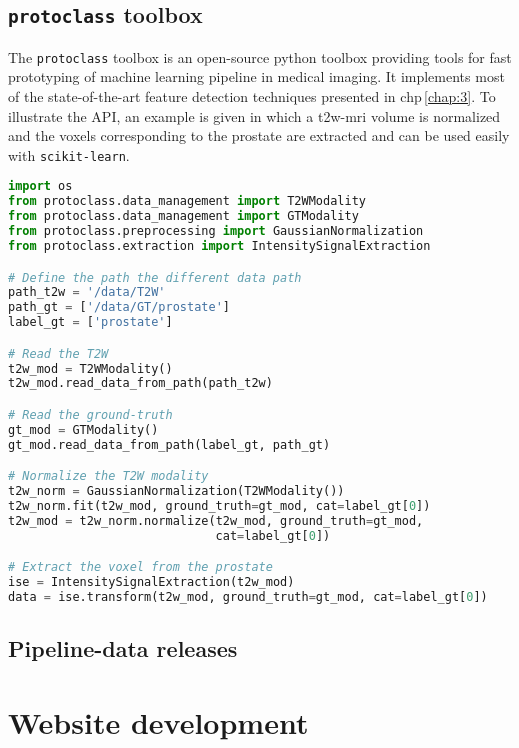 \subsection{\texttt{protoclass} toolbox}

The \texttt{protoclass} toolbox is an open-source python toolbox providing tools for fast prototyping of machine learning pipeline in medical imaging.
It implements most of the state-of-the-art feature detection techniques presented in \acs{chp}\,\ref{chap:3}.
To illustrate the API, an example is given in which a \ac{t2w}-\ac{mri} volume is normalized and the voxels corresponding to the prostate are extracted and can be used easily with \texttt{scikit-learn}.

\begin{lstlisting}[language=Python, caption=Code snippet to normalize a volume and extract some voxels.]
import os
from protoclass.data_management import T2WModality
from protoclass.data_management import GTModality
from protoclass.preprocessing import GaussianNormalization
from protoclass.extraction import IntensitySignalExtraction

# Define the path the different data path
path_t2w = '/data/T2W'
path_gt = ['/data/GT/prostate']
label_gt = ['prostate']

# Read the T2W
t2w_mod = T2WModality()
t2w_mod.read_data_from_path(path_t2w)

# Read the ground-truth
gt_mod = GTModality()
gt_mod.read_data_from_path(label_gt, path_gt)

# Normalize the T2W modality
t2w_norm = GaussianNormalization(T2WModality())
t2w_norm.fit(t2w_mod, ground_truth=gt_mod, cat=label_gt[0])
t2w_mod = t2w_norm.normalize(t2w_mod, ground_truth=gt_mod,
                             cat=label_gt[0])

# Extract the voxel from the prostate
ise = IntensitySignalExtraction(t2w_mod)
data = ise.transform(t2w_mod, ground_truth=gt_mod, cat=label_gt[0])
\end{lstlisting}

\subsection{Pipeline-data releases}

\section{Website development}
